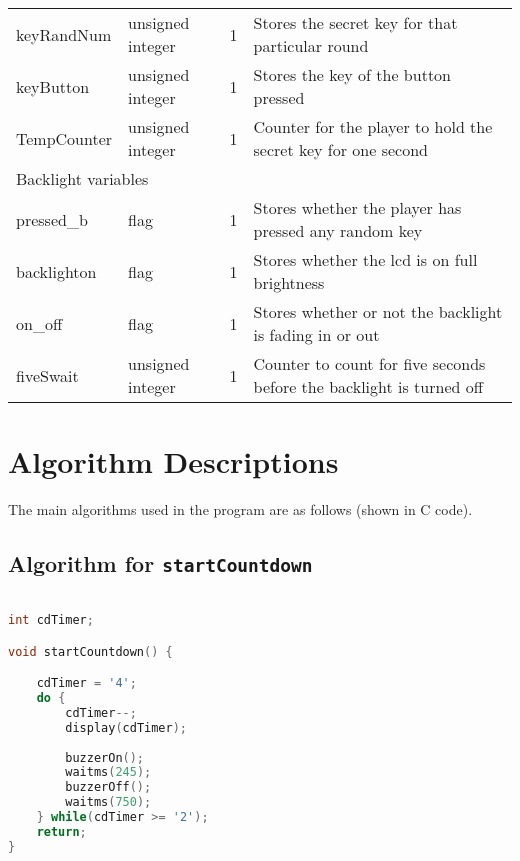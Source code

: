 \documentclass[a4paper]{article}
\begin{document}
\begin{table}[H]
\begin{tabular}{@{}lllp{9cm}@{}}
keyRandNum	 & unsigned integer & 1 & Stores the secret key for that particular round\\
keyButton    & unsigned integer & 1 & Stores the key of the button pressed\\
TempCounter  & unsigned integer & 1 & Counter for the player to hold the secret key for one second\\
\midrule
\multicolumn{4}{l}{Backlight variables} \\ \midrule
pressed\_b	 & flag				& 1 & Stores whether the player has pressed any random key\\
backlighton  & flag 			& 1 & Stores whether the lcd is on full brightness\\
on\_off      & flag 			& 1 & Stores whether or not the backlight is fading in or out\\
fiveSwait	 & unsigned integer & 1 & Counter to count for five seconds before the backlight is turned off\\

\bottomrule
\end{tabular}
\end{table}

\section{Algorithm Descriptions}

The main algorithms used in the program are as follows (shown in C code).

\subsection{Algorithm for \texttt{startCountdown}}
\begin{lstlisting}[language=C]

int cdTimer;

void startCountdown() {

	cdTimer = '4';
	do {
		cdTimer--;
		display(cdTimer);
		
		buzzerOn();
		waitms(245);
		buzzerOff();
		waitms(750);
	} while(cdTimer >= '2');
	return;
}		

\end{lstlisting}
\end{document}
